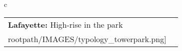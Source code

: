 \begin{table}[H]
        \begin{tabular}{c}
        \begin{tabular}{m{1.5in} m{2in}}
\textbf{Lafayette:} {High-rise in the park} & \texttt{[image: \\rootpath/IMAGES/typology\_towerpark.png]}
\end{tabular}\end{tabular}
        \end{table}